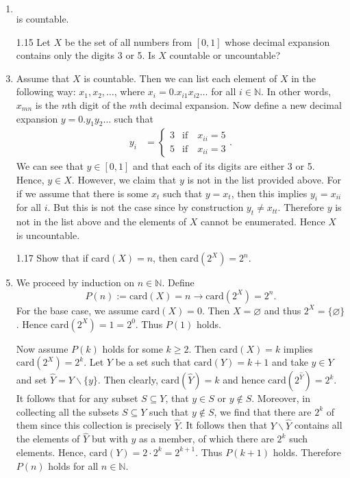 \documentclass[12pt]{article}
\makeatletter
\theoremstyle{definition}
\theoremstyle{remark}
\renewenvironment{proof}[1][\proofname]{\par
  \pushQED{\qed}%
  \normalfont \topsep6\p@\@plus6\p@\relax
  \list{}{\leftmargin=0mm
          \rightmargin=4mm
          \settowidth{\itemindent}{\itshape#1}%
          \labelwidth=\itemindent
          \parsep=0pt \listparindent=\parindent 
  }
  \item[\hskip\labelsep
        \itshape
    #1\@addpunct{.}]\ignorespaces
}{%
  \popQED\endlist\@endpefalse
}
\newenvironment{solution}[1][\bf{\textit{Solution}}]{\par
  
  \normalfont \topsep6\p@\@plus6\p@\relax
  \list{}{\leftmargin=0mm
          \rightmargin=4mm
          \settowidth{\itemindent}{\itshape#1}%
          \labelwidth=\itemindent
          \parsep=0pt \listparindent=\parindent 
  }
  \item[\hskip\labelsep
        \itshape
    #1\@addpunct{.}]\ignorespaces
}{%
  \popQED\endlist\@endpefalse
}
\let\oldproofname=\proofname
\renewcommand{\proofname}{\bf{\textit{\oldproofname}}}
\makeatother
\begin{document}
\begin{enumerate}[leftmargin=*]
\begin{proof}
\begin{equation*}
                    \end{equation*}
                is countable.
            \end{proof}
        \item[1.15] Let $X$ be the set of all numbers from $[0,1]$ whose decimal expansion contains only the digits 3 or 5. Is $X$ countable or uncountable?
            \begin{solution}
                Assume that $X$ is countable. Then we can list each element of $X$ in the following way: $x_1,x_2,\dots$, where $x_i=0.x_{i1}x_{i2}\dots$ for all $i\in\mathbb{N}$. In other words, $x_{mn}$ is the $n$th digit of the $m$th decimal expansion. Now define a new decimal expansion $y=0.y_1y_2\dots$ such that 
                    \begin{align*}
                        y_i &= \begin{cases} 3 & \text{if}\quad x_{ii}=5 \\ 5 & \text{if}\quad x_{ii}=3\end{cases}.
                    \end{align*}
                We can see that $y\in[0,1]$ and that each of its digits are either 3 or 5. Hence, $y\in X$. However, we claim that $y$ is not in the list provided above. For if we assume that there is some $x_t$ such that $y=x_t$, then this implies $y_i=x_{ii}$ for all $i$. But this is not the case since by construction $y_t\neq x_{tt}$. Therefore $y$ is not in the list above and the elements of $X$ cannot be enumerated. Hence $X$ is uncountable.
            \end{solution}\newpage
        \item[1.17] Show that if card$(X)=n$, then card$(2^X)=2^n$.
            \begin{proof}
                We proceed by induction on $n\in\mathbb{N}$. Define
                    \begin{equation*}
                        P(n):=\text{card}(X)=n\rightarrow\text{card}(2^X)=2^n.
                    \end{equation*}
                For the base case, we assume $\text{card}(X)=0$. Then $X=\varnothing$ and thus $2^X=\{\varnothing\}$. Hence card$(2^X)=1=2^0$. Thus $P(1)$ holds.\par\hspace{4mm} Now assume $P(k)$ holds for some $k\geq 2$. Then $\text{card}(X)=k$ implies $\text{card}(2^X)=2^k$. Let $Y$ be a set such that $\text{card}(Y)=k+1$ and take $y\in Y$ and set $\hat{Y}=Y\backslash\{y\}$. Then clearly, $\text{card}(\hat{Y})=k$ and hence $\text{card}(2^{\hat{Y}})=2^k$. It follows that for any subset $S\subseteq Y$, that $y\in S$ or $y\notin S$. Moreover, in collecting all the subsets $S\subseteq Y$ such that $y\notin S$, we find that there are $2^k$ of them since this collection is precisely $\hat{Y}$. It follows then that $Y\backslash\hat{Y}$ contains all the elements of $\hat{Y}$ but with $y$ as a member, of which there are $2^k$ such elements. Hence, $\text{card}(Y)=2\cdot2^k=2^{k+1}$. Thus $P(k+1)$ holds. Therefore $P(n)$ holds for all $n\in\mathbb{N}$.

\end{proof}
\end{enumerate}
\end{document}
